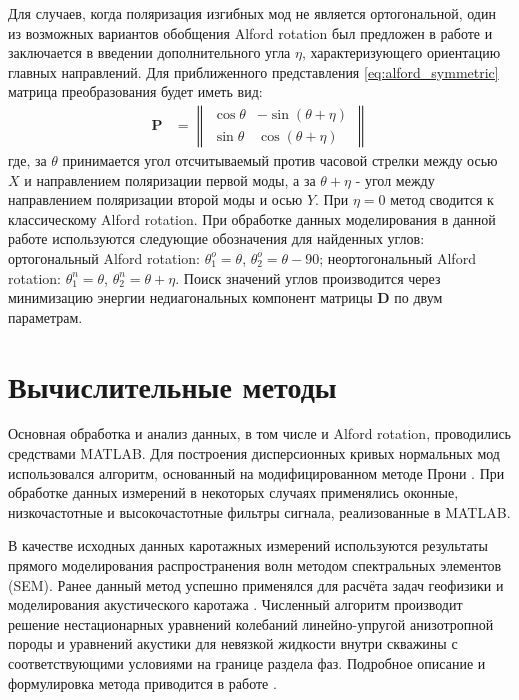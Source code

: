 \documentclass[a4paper,11pt]{article}
\begin{document}
Для случаев, когда поляризация изгибных мод не является ортогональной, один из возможных вариантов обобщения Alford rotation был предложен в работе \cite{Dellinger1998} и заключается в введении дополнительного угла $\eta$, характеризующего ориентацию главных направлений. Для приближенного представления \eqref{eq:alford_symmetric} матрица преобразования будет иметь вид:
\begin{align*}
\mathbf{P} &= \left\|
\begin{array}{cc}
\cos \theta & -\sin (\theta+\eta) \\ 
\sin \theta & \cos (\theta+\eta)
\end{array} 
\right\|
\end{align*}
где, за $\theta$ принимается угол отсчитываемый против часовой стрелки между осью $X$ и направлением поляризации первой моды, а за $\theta + \eta$ - угол между направлением поляризации второй моды и осью $Y$. При $\eta=0$ метод сводится к классическому Alford rotation. При обработке данных моделирования в данной работе используются следующие обозначения для найденных углов: ортогональный Alford rotation: $\theta_1^o=\theta$, $\theta_2^o=\theta-90$; неортогональный Alford rotation: $\theta_1^n=\theta$, $\theta_2^n=\theta+\eta$. Поиск значений углов производится через минимизацию энергии недиагональных компонент матрицы $\mathbf{D}$ по двум параметрам.


\section{Вычислительные методы}
Основная обработка и анализ данных, в том числе и Alford rotation, проводились средствами MATLAB. Для построения дисперсионных кривых нормальных мод использовался алгоритм, основанный на модифицированном методе Прони \cite{Ekstrom1995}. При обработке данных измерений в некоторых случаях применялись оконные, низкочастотные и высокочастотные фильтры сигнала, реализованные в MATLAB. 

В качестве исходных данных каротажных измерений используются результаты прямого моделирования распространения волн методом спектральных элементов (SEM). Ранее данный метод успешно применялся для расчёта задач геофизики \cite{Komatitsch1999} и моделирования акустического каротажа \cite{Charara2011}. Численный алгоритм производит решение нестационарных уравнений колебаний линейно-упругой анизотропной породы и уравнений акустики для невязкой жидкости внутри скважины с соответствующими условиями на границе раздела фаз. Подробное описание и формулировка метода приводится в работе \cite{Komatitsch1999}. %
\end{document}
